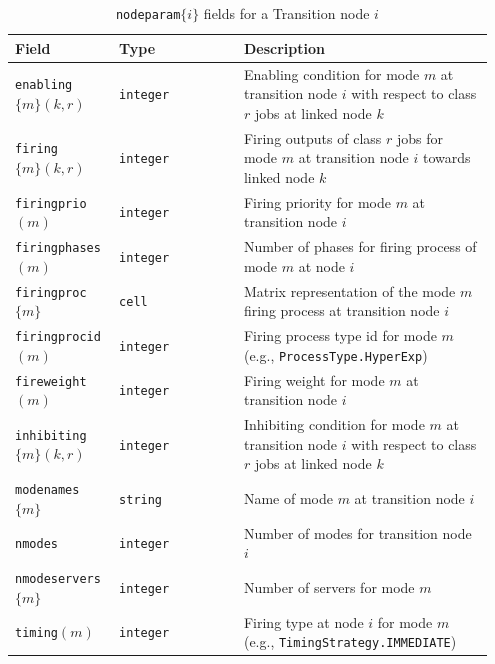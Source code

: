 \begin{MATLAB}
\begin{center}
\begin{table}[thbp]
{\scriptsize
\renewcommand{\arraystretch}{1.2}
\centering
\caption{\texttt{nodeparam}$\{i\}$ fields for a Transition node $i$} %
\begin{tabular}{|p{0.20\linewidth}|p{0.25\linewidth}|p{0.50\linewidth}|}
\hline
\textbf{Field} & \textbf{Type} & \textbf{Description} \\
\hline
\texttt{enabling}$\{m\}(k,r)$ & \texttt{integer} & Enabling condition for mode $m$ at transition node $i$ with respect to class $r$ jobs at linked node $k$\\\hline
\texttt{firing}$\{m\}(k,r)$ & \texttt{integer} & Firing outputs of class $r$ jobs for mode $m$ at transition node $i$ towards linked node $k$\\\hline
\texttt{firingprio}$(m)$ & \texttt{integer} & Firing priority for mode $m$ at transition node $i$ \\\hline
\texttt{firingphases}$(m)$ & \texttt{integer} & Number of phases for firing process of mode $m$ at node $i$\\\hline
\texttt{firingproc}$\{m\}$ & \texttt{cell} & Matrix representation of the mode $m$ firing process at transition node $i$\\\hline
\texttt{firingprocid}$(m)$ & \texttt{integer} & Firing process type id  for mode $m$ (e.g., \texttt{ProcessType.HyperExp})\\\hline
\texttt{fireweight}$(m)$ & \texttt{integer} & Firing weight for mode $m$ at transition node $i$ \\\hline
\texttt{inhibiting}$\{m\}(k,r)$ & \texttt{integer} & Inhibiting condition for mode $m$ at transition node $i$ with respect to class $r$ jobs at linked node $k$\\\hline
\texttt{modenames}$\{m\}$ & \texttt{string} & Name of mode $m$ at transition node $i$\\\hline
\texttt{nmodes} & \texttt{integer} & Number of modes for transition node $i$\\\hline
\texttt{nmodeservers}$\{m\}$ & \texttt{integer} & Number of servers for mode $m$\\\hline
\texttt{timing}$(m)$ & \texttt{integer} & Firing type at node $i$ for mode $m$ (e.g., \texttt{TimingStrategy.IMMEDIATE}) \\\hline
\end{tabular}
}
\label{TAB_PETRIPAR}
\end{table}


\end{center}
\end{MATLAB}
